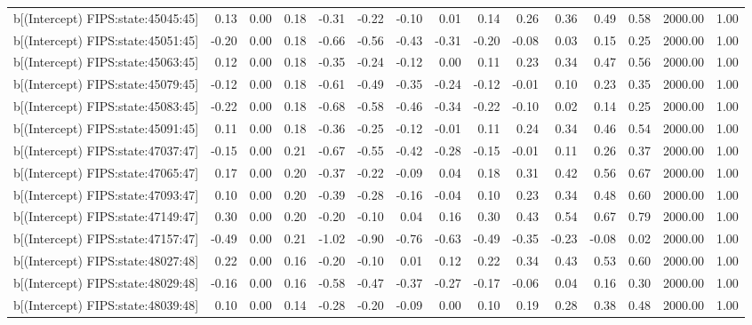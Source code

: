 \begin{table}[ht]
\begin{tabular}{rrrrrrrrrrrrrrr}
  b[(Intercept) FIPS:state:45045:45] & 0.13 & 0.00 & 0.18 & -0.31 & -0.22 & -0.10 & 0.01 & 0.14 & 0.26 & 0.36 & 0.49 & 0.58 & 2000.00 & 1.00 \\ 
  b[(Intercept) FIPS:state:45051:45] & -0.20 & 0.00 & 0.18 & -0.66 & -0.56 & -0.43 & -0.31 & -0.20 & -0.08 & 0.03 & 0.15 & 0.25 & 2000.00 & 1.00 \\ 
  b[(Intercept) FIPS:state:45063:45] & 0.12 & 0.00 & 0.18 & -0.35 & -0.24 & -0.12 & 0.00 & 0.11 & 0.23 & 0.34 & 0.47 & 0.56 & 2000.00 & 1.00 \\ 
  b[(Intercept) FIPS:state:45079:45] & -0.12 & 0.00 & 0.18 & -0.61 & -0.49 & -0.35 & -0.24 & -0.12 & -0.01 & 0.10 & 0.23 & 0.35 & 2000.00 & 1.00 \\ 
  b[(Intercept) FIPS:state:45083:45] & -0.22 & 0.00 & 0.18 & -0.68 & -0.58 & -0.46 & -0.34 & -0.22 & -0.10 & 0.02 & 0.14 & 0.25 & 2000.00 & 1.00 \\ 
  b[(Intercept) FIPS:state:45091:45] & 0.11 & 0.00 & 0.18 & -0.36 & -0.25 & -0.12 & -0.01 & 0.11 & 0.24 & 0.34 & 0.46 & 0.54 & 2000.00 & 1.00 \\ 
  b[(Intercept) FIPS:state:47037:47] & -0.15 & 0.00 & 0.21 & -0.67 & -0.55 & -0.42 & -0.28 & -0.15 & -0.01 & 0.11 & 0.26 & 0.37 & 2000.00 & 1.00 \\ 
  b[(Intercept) FIPS:state:47065:47] & 0.17 & 0.00 & 0.20 & -0.37 & -0.22 & -0.09 & 0.04 & 0.18 & 0.31 & 0.42 & 0.56 & 0.67 & 2000.00 & 1.00 \\ 
  b[(Intercept) FIPS:state:47093:47] & 0.10 & 0.00 & 0.20 & -0.39 & -0.28 & -0.16 & -0.04 & 0.10 & 0.23 & 0.34 & 0.48 & 0.60 & 2000.00 & 1.00 \\ 
  b[(Intercept) FIPS:state:47149:47] & 0.30 & 0.00 & 0.20 & -0.20 & -0.10 & 0.04 & 0.16 & 0.30 & 0.43 & 0.54 & 0.67 & 0.79 & 2000.00 & 1.00 \\ 
  b[(Intercept) FIPS:state:47157:47] & -0.49 & 0.00 & 0.21 & -1.02 & -0.90 & -0.76 & -0.63 & -0.49 & -0.35 & -0.23 & -0.08 & 0.02 & 2000.00 & 1.00 \\ 
  b[(Intercept) FIPS:state:48027:48] & 0.22 & 0.00 & 0.16 & -0.20 & -0.10 & 0.01 & 0.12 & 0.22 & 0.34 & 0.43 & 0.53 & 0.60 & 2000.00 & 1.00 \\ 
  b[(Intercept) FIPS:state:48029:48] & -0.16 & 0.00 & 0.16 & -0.58 & -0.47 & -0.37 & -0.27 & -0.17 & -0.06 & 0.04 & 0.16 & 0.30 & 2000.00 & 1.00 \\ 
  b[(Intercept) FIPS:state:48039:48] & 0.10 & 0.00 & 0.14 & -0.28 & -0.20 & -0.09 & 0.00 & 0.10 & 0.19 & 0.28 & 0.38 & 0.48 & 2000.00 & 1.00 \\ 

\end{tabular}
\end{table}
